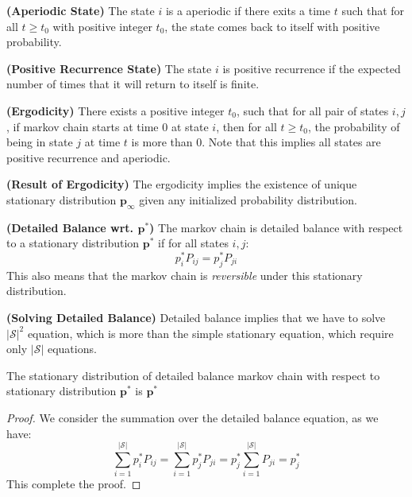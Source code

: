 \begin{definition}{\textbf{(Aperiodic State)}}
    The state $i$ is a aperiodic if there exits a time $t$ such that for all $t\ge t_0$ with positive integer $t_0$, the state comes back to itself with positive probability. 
\end{definition}

\begin{definition}{\textbf{(Positive Recurrence State)}}
    The state $i$ is positive recurrence if the expected number of times that it will return to itself is finite. 
\end{definition}

\begin{definition}{\textbf{(Ergodicity)}}
    There exists a positive integer $t_0$, such that for all pair of states $i, j$, if markov chain starts at time $0$ at state $i$, then for all $t\ge t_0$, the probability of being in state $j$ at time $t$ is more than $0$. Note that this implies all states are positive recurrence and aperiodic.
\end{definition}

\begin{theorem}{\textbf{(Result of Ergodicity)}}
    The ergodicity implies the existence of unique stationary distribution $\boldsymbol p_\infty$ given any initialized probability distribution. 
\end{theorem}

\begin{definition}{\textbf{(Detailed Balance wrt. $\boldsymbol p^*$)}}
    The markov chain is detailed balance with respect to a stationary distribution $\boldsymbol p^*$ if for all states $i, j$:
    \begin{equation*}
        p^*_i P_{ij} = p^*_j P_{ji}
    \end{equation*}
    This also means that the markov chain is \emph{reversible} under this stationary distribution.
\end{definition}

\begin{remark}{\textbf{(Solving Detailed Balance)}}
    Detailed balance implies that we have to solve $|\mathcal{S}|^2$ equation, which is more than the simple stationary equation, which require only $|\mathcal{S}|$ equations. 
\end{remark}

\begin{proposition}
    The stationary distribution of detailed balance markov chain with respect to stationary distribution $\boldsymbol p^*$ is $\boldsymbol p^*$
\end{proposition}
\begin{proof}
    We consider the summation over the detailed balance equation, as we have:
    \begin{equation*}
        \sum^{|\mathcal{S}|}_{i=1}p^*_i P_{ij} = \sum^{|\mathcal{S}|}_{i=1}p^*_j P_{ji} = p^*_j\sum^{|\mathcal{S}|}_{i=1} P_{ji} = p^*_j
    \end{equation*}
    This complete the proof.
\end{proof}

